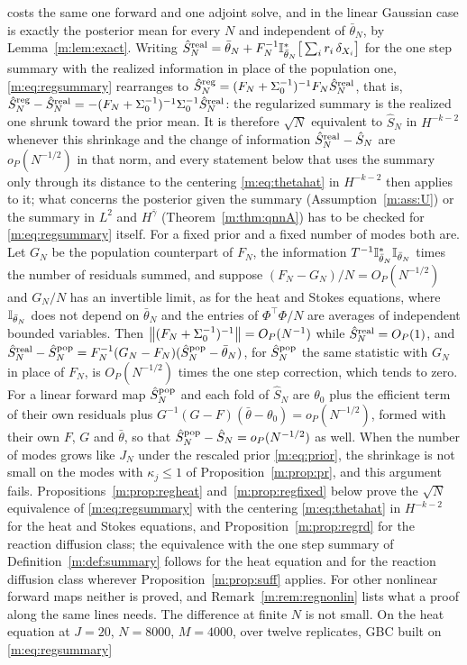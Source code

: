 \begin{remark}
costs the same one forward and one adjoint solve, and in the linear Gaussian case is exactly the posterior mean for every $N$ and independent of $\bar\theta_N$, by Lemma~\ref{m:lem:exact}. Writing $\hat S^{\rm real}_N=\bar\theta_N+F_N^{-1}\mathbb{I}^*_{\bar\theta_N}\big[\sum_ir_i\,\delta_{X_i}\big]$ for the one step summary with the realized information in place of the population one, \eqref{m:eq:regsummary} rearranges to $\hat S^{\rm reg}_N=(F_N+\Sigma_0^{-1})^{-1}F_N\hat S^{\rm real}_N$, that is, $\hat S^{\rm reg}_N-\hat S^{\rm real}_N=-(F_N+\Sigma_0^{-1})^{-1}\Sigma_0^{-1}\hat S^{\rm real}_N$: the regularized summary is the realized one shrunk toward the prior mean. It is therefore $\sqrt N$ equivalent to $\hat S_N$ in $H^{-k-2}$ whenever this shrinkage and the change of information $\hat S^{\rm real}_N-\hat S_N$ are $o_P(N^{-1/2})$ in that norm, and every statement below that uses the summary only through its distance to the centering \eqref{m:eq:thetahat} in $H^{-k-2}$ then applies to it; what concerns the posterior given the summary (Assumption~\ref{m:ass:U}) or the summary in $L^2$ and $H^{\bar\gamma}$ (Theorem~\ref{m:thm:qnnA}) has to be checked for \eqref{m:eq:regsummary} itself. For a fixed prior and a fixed number of modes both are. Let $G_N$ be the population counterpart of $F_N$, the information $T^{-1}\mathbb{I}^*_{\bar\theta_N}\mathbb{I}_{\bar\theta_N}$ times the number of residuals summed, and suppose $(F_N-G_N)/N=O_P(N^{-1/2})$ and $G_N/N$ has an invertible limit, as for the heat and Stokes equations, where $\mathbb{I}_{\bar\theta_N}$ does not depend on $\bar\theta_N$ and the entries of $\Phi^\top\Phi/N$ are averages of independent bounded variables. Then $\left\|(F_N+\Sigma_0^{-1})^{-1}\right\|=O_P(N^{-1})$ while $\hat S^{\rm real}_N=O_P(1)$, and $\hat S^{\rm real}_N-\hat S^{\rm pop}_N=F_N^{-1}(G_N-F_N)(\hat S^{\rm pop}_N-\bar\theta_N)$, for $\hat S^{\rm pop}_N$ the same statistic with $G_N$ in place of $F_N$, is $O_P(N^{-1/2})$ times the one step correction, which tends to zero. For a linear forward map $\hat S^{\rm pop}_N$ and each fold of $\hat S_N$ are $\theta_0$ plus the efficient term of their own residuals plus $G^{-1}(G-F)(\bar\theta-\theta_0)=o_P(N^{-1/2})$, formed with their own $F$, $G$ and $\bar\theta$, so that $\hat S^{\rm pop}_N-\hat S_N=o_P(N^{-1/2})$ as well. When the number of modes grows like $J_N$ under the rescaled prior \eqref{m:eq:prior}, the shrinkage is not small on the modes with $\kappa_j\le1$ of Proposition~\ref{m:prop:pr}, and this argument fails. Propositions~\ref{m:prop:regheat} and~\ref{m:prop:regfixed} below prove the $\sqrt N$ equivalence of \eqref{m:eq:regsummary} with the centering \eqref{m:eq:thetahat} in $H^{-k-2}$ for the heat and Stokes equations, and Proposition~\ref{m:prop:regrd} for the reaction diffusion class; the equivalence with the one step summary of Definition~\ref{m:def:summary} follows for the heat equation and for the reaction diffusion class wherever Proposition~\ref{m:prop:suff} applies. For other nonlinear forward maps neither is proved, and Remark~\ref{m:rem:regnonlin} lists what a proof along the same lines needs. The difference at finite $N$ is not small. On the heat equation at $J=20$, $N=8000$, $M=4000$, over twelve replicates, GBC built on \eqref{m:eq:regsummary} 
\end{remark}

